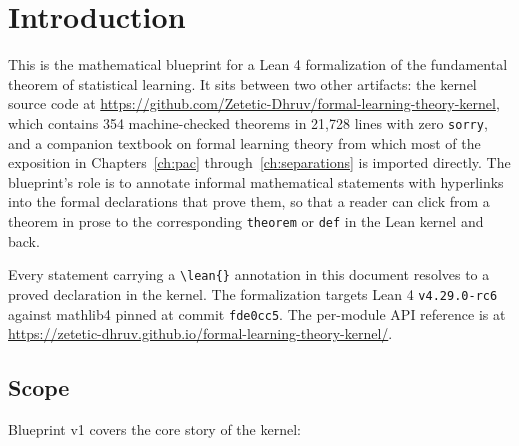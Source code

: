 
\chapter{Introduction}\label{chap:intro}

This is the mathematical blueprint for a Lean 4 formalization of the
fundamental theorem of statistical learning. It sits between two other
artifacts: the kernel source code at
\url{https://github.com/Zetetic-Dhruv/formal-learning-theory-kernel},
which contains 354 machine-checked theorems in 21{,}728 lines with zero
\texttt{sorry}, and a companion textbook on formal learning theory from
which most of the exposition in Chapters~\ref{ch:pac}
through~\ref{ch:separations} is imported directly. The blueprint's
role is to annotate informal mathematical statements with hyperlinks
into the formal declarations that prove them, so that a reader can
click from a theorem in prose to the corresponding
\texttt{theorem} or \texttt{def} in the Lean kernel and back.

Every statement carrying a \texttt{\textbackslash lean\{\}} annotation
in this document resolves to a proved declaration in the kernel.
The formalization targets Lean 4 \texttt{v4.29.0-rc6} against mathlib4
pinned at commit \texttt{fde0cc5}. The per-module API reference is at
\url{https://zetetic-dhruv.github.io/formal-learning-theory-kernel/}.

\section*{Scope}

Blueprint v1 covers the core story of the kernel:

